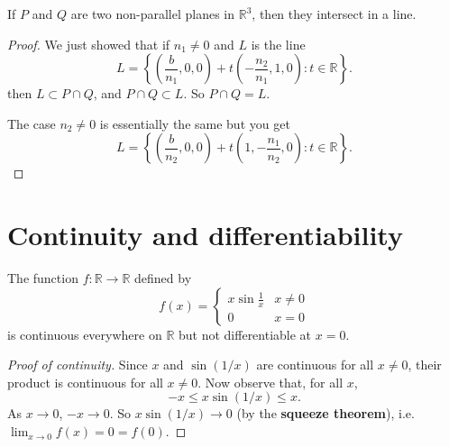 \documentclass{beamer}
\newcommand{\R}{\mathbb{R}}
\begin{document}
\begin{frame}

\begin{theorem}
  If $ P $ and $ Q $ are two non-parallel planes in $ \R^3 $, then they intersect in a line.
\end{theorem}

\begin{proof}
  We just showed that if $ n_1 \neq 0 $ and $ L $ is the line
  \begin{displaymath}
    L = \left\{ \left( \frac{b}{n_1}, 0, 0 \right) + t \left( -\frac{n_2}{n_1}, 1, 0 \right) : t \in \R \right\}.
  \end{displaymath}
  then $ L \subset P\cap Q $, and $ P \cap Q \subset L $. So $ P \cap Q = L $.

  The case $ n_2 \neq 0 $ is essentially the same but you get
  \begin{displaymath}
    L = \left\{ \left( \frac{b}{n_2}, 0, 0 \right) + t \left(1,  -\frac{n_1}{n_2}, 0 \right) : t \in \R \right\}.
  \end{displaymath}
\end{proof}
\end{frame}


\section{Continuity and differentiability}

\begin{frame}
\begin{theorem}
  The function $ f : \R \to \R $ defined by
  \begin{displaymath} f(x) = \begin{cases} x \sin \frac{1}{x} & x \neq 0\\ 0 & x = 0 \end{cases} \end{displaymath}
  is continuous everywhere on $ \R $ but not differentiable at $ x = 0 $.
\end{theorem}
\begin{proof}[Proof of continuity]
  Since $ x $ and $ \sin(1/x) $ are continuous for all $ x \neq 0 $, their product is continuous for all $ x \neq 0 $. Now observe that, for all $ x $,
  \begin{displaymath}
    -x \leq x \sin (1/x) \leq x.
  \end{displaymath}
  As $ x \to 0 $, $ -x \to 0 $. So $ x \sin (1/x) \to 0 $ (by the \textbf{squeeze theorem}), i.e. $ \lim_{x \to 0} f(x) = 0 = f(0) $.
\end{proof}
\end{frame}
\end{document}
